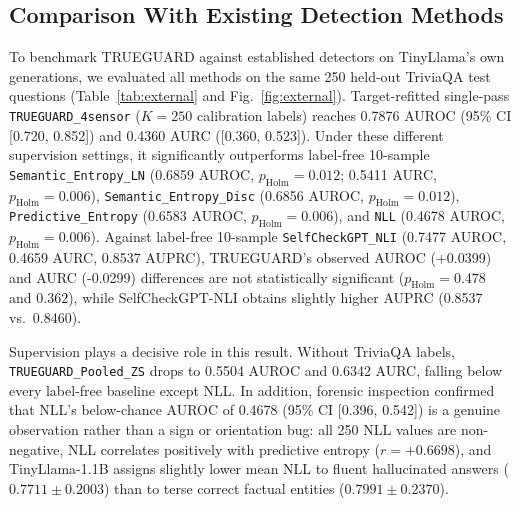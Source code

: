 \documentclass{ieeeaccess}
\begin{document}
\subsection{Comparison With Existing Detection Methods}
To benchmark TRUEGUARD against established detectors on TinyLlama's own generations, we evaluated all methods on the same 250 held-out TriviaQA test questions (Table~\ref{tab:external} and Fig.~\ref{fig:external}). Target-refitted single-pass \texttt{TRUEGUARD\_4sensor} ($K = 250$ calibration labels) reaches 0.7876 AUROC (95\% CI [0.720, 0.852]) and 0.4360 AURC ([0.360, 0.523]). Under these different supervision settings, it significantly outperforms label-free 10-sample \texttt{Semantic\_Entropy\_LN} (0.6859 AUROC, $p_{\text{Holm}} = 0.012$; 0.5411 AURC, $p_{\text{Holm}} = 0.006$), \texttt{Semantic\_Entropy\_Disc} (0.6856 AUROC, $p_{\text{Holm}} = 0.012$), \texttt{Predictive\_Entropy} (0.6583 AUROC, $p_{\text{Holm}} = 0.006$), and \texttt{NLL} (0.4678 AUROC, $p_{\text{Holm}} = 0.006$). Against label-free 10-sample \texttt{SelfCheckGPT\_NLI} (0.7477 AUROC, 0.4659 AURC, 0.8537 AUPRC), TRUEGUARD's observed AUROC (+0.0399) and AURC (-0.0299) differences are not statistically significant ($p_{\text{Holm}} = 0.478$ and $0.362$), while SelfCheckGPT-NLI obtains slightly higher AUPRC (0.8537 vs.\ 0.8460).

Supervision plays a decisive role in this result. Without TriviaQA labels, \texttt{TRUEGUARD\_Pooled\_ZS} drops to 0.5504 AUROC and 0.6342 AURC, falling below every label-free baseline except NLL. In addition, forensic inspection confirmed that NLL's below-chance AUROC of 0.4678 (95\% CI [0.396, 0.542]) is a genuine observation rather than a sign or orientation bug: all 250 NLL values are non-negative, NLL correlates positively with predictive entropy ($r = +0.6698$), and TinyLlama-1.1B assigns slightly lower mean NLL to fluent hallucinated answers ($0.7711 \pm 0.2003$) than to terse correct factual entities ($0.7991 \pm 0.2370$).
\end{document}
